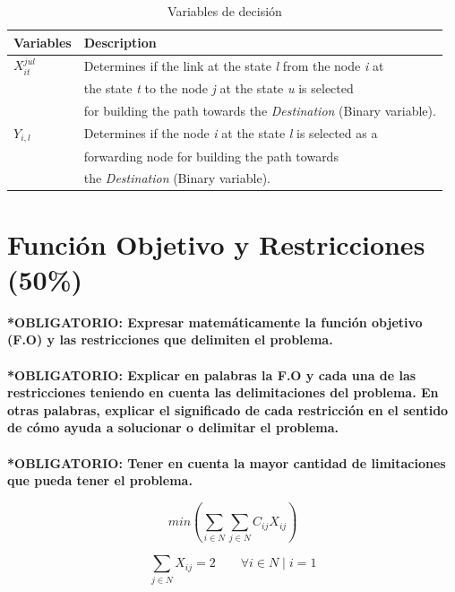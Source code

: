 \documentclass[runningheads]{llncs}
\begin{document}
\begin{table}[h]
	\caption{Variables de decisi\'{o}n}
	\begin{tabular*}{\hsize}{@{\extracolsep{\fill}}ll@{}}
		\hline
		\textbf{Variables} & \textbf{Description}\\
		\hline
		$X_{it}^{jul}$ &  Determines if the link at the state \textit{l} from the node \textit{i} at  \\ 
		&  the state \textit{t} to the node \textit{j} at the state \textit{u} is selected \\
		&  for building the path towards the \textit{Destination} (Binary variable). \\
		$Y_{i,l}$ &  Determines if the node \textit{i} at the state \textit{l} is selected as a \\
		&  forwarding node for building the path towards \\
		&  the \textit{Destination} (Binary variable).\\
		\hline
	\end{tabular*}
\end{table}

\newpage
\section{Funci\'{o}n Objetivo y Restricciones (50\%)}

\textbf{*OBLIGATORIO: Expresar matem\'{a}ticamente la funci\'{o}n objetivo (F.O) y las restricciones que delimiten el problema.}
\\ \\
\textbf{*OBLIGATORIO: Explicar en palabras la F.O y cada una de las restricciones teniendo en cuenta las delimitaciones del problema. En otras palabras, explicar el significado de cada restricci\'{o}n en el sentido de c\'{o}mo ayuda a solucionar o delimitar el problema.}
\\ \\
\textbf{*OBLIGATORIO: Tener en cuenta la mayor cantidad de limitaciones que pueda tener el problema. }

\begin{equation}
min (\sum_{i \in N} \sum_{j \in N} C_{ij} X_{ij})
\label{eq:res1}
\end{equation}

\begin{equation}
\sum_{j \in N} X_{ij} = 2   \qquad \forall{i \in N} \mid i=1
\label{eq:res2}
\end{equation}
\end{document}

